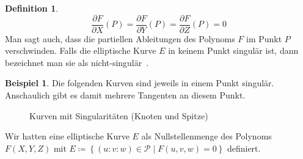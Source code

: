 \documentclass[hidelinks]{article}
\theoremstyle{plain}
\theoremstyle{definition}
\newtheorem{defn}[thm]{Definition}
\newtheorem{bsp}[thm]{Beispiel}
\theoremstyle{rem}
\begin{document}
\begin{sloppypar}
\begin{defn}
    \begin{equation*}
        \frac{\partial F}{\partial X}(P) = \frac{\partial F}{\partial Y}(P) =  \frac{\partial F}{\partial Z}(P) = 0
    \end{equation*}
    Man sagt auch, dass die partiellen Ableitungen des Polynoms $F$ im Punkt $P$ verschwinden. Falls die elliptische Kurve $E$ in keinem Punkt singulär ist, dann bezeichnet man sie als nicht-singulär~\cite[Seite~227]{karpfinger-kiechle}.
\end{defn}
\begin{bsp}
    Die folgenden Kurven sind jeweils in einem Punkt singulär. Anschaulich gibt es damit mehrere Tangenten an diesem Punkt.
    \begin{figure}[H]
        \centering
        \qquad
        \caption{Kurven mit Singularitäten (Knoten und Spitze)}
    \end{figure}
\end{bsp}
Wir hatten eine elliptische Kurve $E$ als Nullstellenmenge des Polynoms $F(X,Y,Z)$ mit \mbox{$E \coloneqq \left\{(u:v:w) \in \mathcal{P} \mid F(u,v,w) = 0 \right\}$} definiert.

\end{sloppypar}
\end{document}
